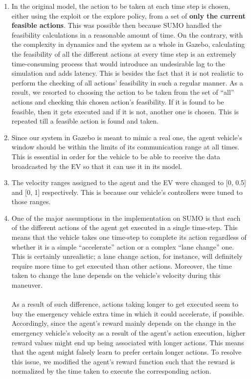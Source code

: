 \begin{enumerate}
    \item In the original model, the action to be taken at each time step is chosen, either using the exploit or the explore policy, from a set of \textbf{only the current feasible actions}. This was possible then because SUMO handled the feasibility calculations in a reasonable amount of time. On the contrary, with the complexity in dynamics and the system as a whole in Gazebo, calculating the feasibility of all the different actions at every time step is an extremely time-consuming process that would introduce an undesirable lag to the simulation and adds latency. This is besides the fact that it is not realistic to perform the  checking of all actions’ feasibility in such a regular manner. As a result, we resorted to choosing the action to be taken from the set of “all” actions and checking this chosen action’s feasibility. If it is found to be feasible, then it gets executed and if it is not, another one is chosen. This is repeated till a feasible action is found and taken. 
    \item Since our system in Gazebo is meant to mimic a real one, the agent vehicle’s window should be within the limits of its communication range at all times. This is essential in order for the vehicle to be able to receive the data broadcasted by the EV so that it can use it in its model.
    \item The velocity ranges assigned to the agent and the EV were changed to [0, 0.5] and [0, 1] respectively. This is because our vehicle’s controllers were tuned to those ranges.
    \label{vel_ranges_pt}
    \item One of the major assumptions in the implementation on SUMO is that each of the different actions of the agent get executed in a single time-step. This means that the vehicle takes one time-step to complete its action regardless of whether it is a simple “accelerate” action or a complex “lane change” one. This is certainly unrealistic; a lane change action, for instance, will definitely require more time to get executed than other actions. Moreover, the time taken to change the lane depends on the vehicle’s velocity during this maneuver. \\ \\
    As a result of such difference, actions taking longer to get executed seem to buy the emergency vehicle extra time in which it could accelerate, if possible. Accordingly, since the agent’s reward mainly depends on the change in the emergency vehicle’s velocity as a result of the agent’s action execution, higher reward values might end up being associated with longer actions. This means that the agent might falsely learn to prefer certain longer actions. To resolve this issue, we modified the agent’s reward function such that the reward is normalized by the time taken to execute the corresponding action.

\end{enumerate}
